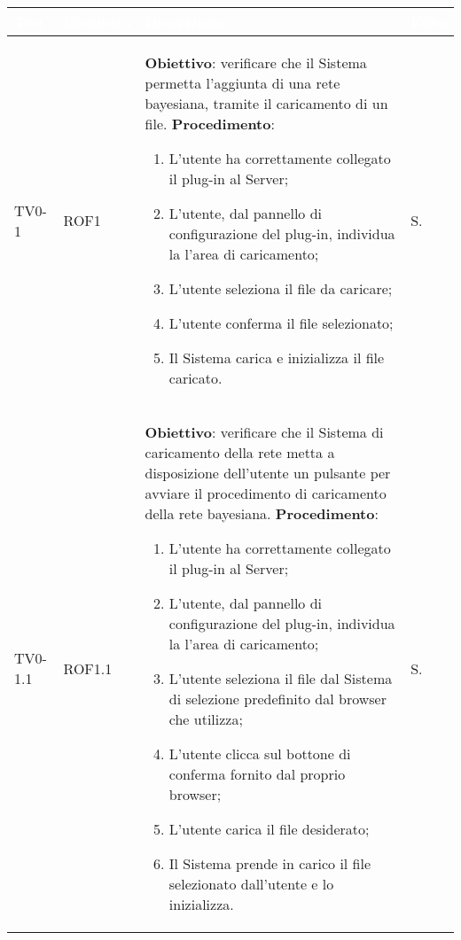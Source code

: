 \begin{longtable}{|C{.15\textwidth}|C{.13\textwidth}|m{.65\textwidth}|C{.08\textwidth}|}
\hline
{}\textbf{\textcolor{white}{Test}} & \textbf{\textcolor{white}{Requisito}} & \textbf{\textcolor{white}{Descrizione}} & \textbf{\textcolor{white}{Esito}}\\
\hline \hline
\endhead

TV0-1 & ROF1 &
	\textbf{Obiettivo}: verificare che il Sistema permetta l'aggiunta di una rete bayesiana, tramite il caricamento di un file. \newline
	\textbf{Procedimento}:
	\begin{enumerate}
		\item L'utente ha correttamente collegato il plug-in al Server;
		\item L'utente, dal pannello di configurazione del plug-in, individua la l'area di caricamento;
		\item L'utente seleziona il file da caricare;
		\item L'utente conferma il file selezionato;
		\item Il Sistema carica e inizializza il file caricato.
	\end{enumerate} & S. \\
\hline

 TV0-1.1 & ROF1.1 &
	\textbf{Obiettivo}: verificare che il Sistema di caricamento della rete metta a disposizione dell'utente un pulsante per avviare il procedimento di caricamento della rete bayesiana.
	\textbf{Procedimento}:
	\begin{enumerate}
		\item L'utente ha correttamente collegato il plug-in al Server;
		\item L'utente, dal pannello di configurazione del plug-in, individua la l'area di caricamento;
		\item L'utente seleziona il file dal Sistema di selezione predefinito dal browser che utilizza;
		\item L'utente clicca sul bottone di conferma fornito dal proprio browser;
		\item L'utente carica il file desiderato;
		\item Il Sistema prende in carico il file selezionato dall'utente e lo inizializza.
	\end{enumerate}
	& S. \\
\hline


\end{longtable}
